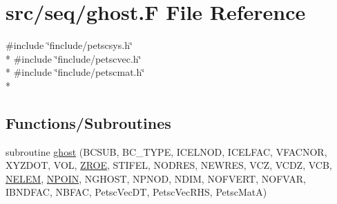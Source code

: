 \hypertarget{seq_2ghost_8_f}{\section{src/seq/ghost.F File Reference}
\label{seq_2ghost_8_f}
}
{\ttfamily \#include \char`\"{}finclude/petscsys.\-h\char`\"{}}\\*
{\ttfamily \#include \char`\"{}finclude/petscvec.\-h\char`\"{}}\\*
{\ttfamily \#include \char`\"{}finclude/petscmat.\-h\char`\"{}}\\*
\subsection*{Functions/\-Subroutines}
\begin{DoxyCompactItemize}
\item 
subroutine \hyperlink{seq_2ghost_8_f_afa697c6073bce293909a4e8a8cf5b1d8}{ghost} (B\-C\-S\-U\-B, B\-C\-\_\-\-T\-Y\-P\-E, I\-C\-E\-L\-N\-O\-D, I\-C\-E\-L\-F\-A\-C, V\-F\-A\-C\-N\-O\-R, X\-Y\-Z\-D\-O\-T, V\-O\-L, \hyperlink{myts_8com_a0c4fbcdb78e6b50c8919d714e4b5a694}{Z\-R\-O\-E}, S\-T\-I\-F\-E\-L, N\-O\-D\-R\-E\-S, N\-E\-W\-R\-E\-S, V\-C\-Z, V\-C\-D\-Z, V\-C\-B, \hyperlink{mesh_8com_aee5e75b79d0e815c0603cfbccc618957}{N\-E\-L\-E\-M}, \hyperlink{mesh_8com_ae28c1572321efcd8715b974d87d20c58}{N\-P\-O\-I\-N}, N\-G\-H\-O\-S\-T, N\-P\-N\-O\-D, N\-D\-I\-M, N\-O\-F\-V\-E\-R\-T, N\-O\-F\-V\-A\-R, I\-B\-N\-D\-F\-A\-C, N\-B\-F\-A\-C, Petsc\-Vec\-D\-T, Petsc\-Vec\-R\-H\-S, Petsc\-Mat\-A)
\end{DoxyCompactItemize}



